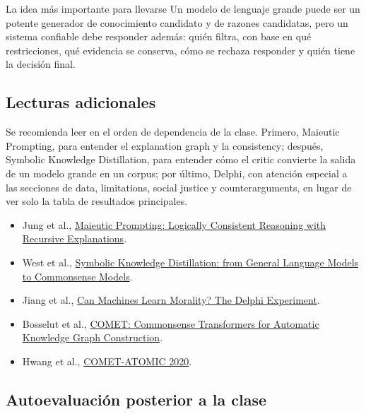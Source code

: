 \begin{importantbox}{La idea más importante para llevarse}
Un modelo de lenguaje grande puede ser un potente generador de conocimiento candidato y de razones candidatas, pero un sistema confiable debe responder además: quién filtra, con base en qué restricciones, qué evidencia se conserva, cómo se rechaza responder y quién tiene la decisión final.
\end{importantbox}

\subsection{Lecturas adicionales}

Se recomienda leer en el orden de dependencia de la clase. Primero, Maieutic Prompting, para entender el explanation graph y la consistency; después, Symbolic Knowledge Distillation, para entender cómo el critic convierte la salida de un modelo grande en un corpus; por último, Delphi, con atención especial a las secciones de data, limitations, social justice y counterarguments, en lugar de ver solo la tabla de resultados principales.

\begin{itemize}
  \item Jung et al., \href{https://arxiv.org/abs/2205.11822}{Maieutic Prompting: Logically Consistent Reasoning with Recursive Explanations}.
  \item West et al., \href{https://arxiv.org/abs/2110.07178}{Symbolic Knowledge Distillation: from General Language Models to Commonsense Models}.
  \item Jiang et al., \href{https://arxiv.org/abs/2110.07574}{Can Machines Learn Morality? The Delphi Experiment}.
  \item Bosselut et al., \href{https://aclanthology.org/P19-1470/}{COMET: Commonsense Transformers for Automatic Knowledge Graph Construction}.
  \item Hwang et al., \href{https://arxiv.org/abs/2010.05953}{COMET-ATOMIC 2020}.
\end{itemize}

\subsection{Autoevaluación posterior a la clase}

